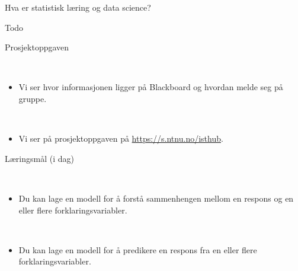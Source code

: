 \documentclass[10pt,ignorenonframetext,]{beamer}
\providecommand{\tightlist}{%
  \setlength{\itemsep}{0pt}\setlength{\parskip}{0pt}}
\begin{document}
\begin{frame}{Hva er statistisk læring og data science?}
\protect\hypertarget{hva-er-statistisk-luxe6ring-og-data-science}{}

Todo

\end{frame}

\begin{frame}{Prosjektoppgaven}
\protect\hypertarget{prosjektoppgaven}{}

\(~\)

\begin{itemize}
\tightlist
\item
  Vi ser hvor informasjonen ligger på Blackboard og hvordan melde seg på
  gruppe.
\end{itemize}

\(~\)

\begin{itemize}
\tightlist
\item
  Vi ser på prosjektoppgaven på \url{https://s.ntnu.no/isthub}.
\end{itemize}

\end{frame}

\begin{frame}{Læringsmål (i dag)}
\protect\hypertarget{luxe6ringsmuxe5l-i-dag}{}

\(~\)

\begin{itemize}
\tightlist
\item
  Du kan lage en modell for å forstå sammenhengen mellom en respons og
  en eller flere forklaringsvariabler.
\end{itemize}

\(~\)

\begin{itemize}
\tightlist
\item
  Du kan lage en modell for å predikere en respons fra en eller flere
  forklaringsvariabler.
\end{itemize}

\end{frame}
\end{document}
